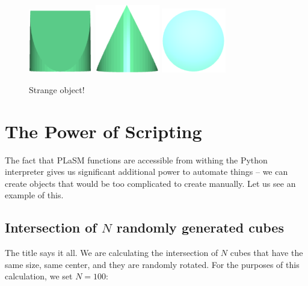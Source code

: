 \documentclass[article,A4,12pt]{llncs}
\begin{document}
\begin{figure}[!ht]
\begin{center}
\includegraphics[width=0.25\textwidth]{img/int-1a.png}
\includegraphics[width=0.25\textwidth]{img/int-1b.png}
\includegraphics[width=0.25\textwidth]{img/int-1c.png}
\end{center}
\vspace{-2mm}
\caption{Strange object!}
\label{fig:int-1}
\end{figure}

\section{The Power of Scripting}

The fact that PLaSM functions are accessible from withing the Python 
interpreter gives us significant additional power to automate things 
-- we can create objects that would be too complicated to create manually. 
Let us see an example of this.

\subsection{Intersection of $N$ randomly generated cubes}

The title says it all. We are calculating the intersection of 
$N$ cubes that have the same size, same center, and they are 
randomly rotated. For the purposes of this calculation, we
set $N = 100$:
\end{document}
